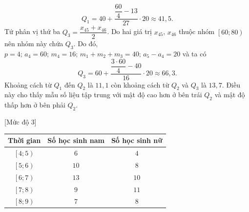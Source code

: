 \begin{bt}
{\begin{enumerate}
			$$Q_1=40+\dfrac{\dfrac{60}{4}-13}{27}\cdot 20\approx 41{,}5.$$
			Tứ phân vị thứ ba $Q_3=\dfrac{x_{45}+x_{46}}{2}$. Do hai giá trị $x_{45}$, $x_{46}$ thuộc nhóm $\left[60;80\right)$ nên nhóm này chứa $Q_3$. Do đó, $p=4;\,a_4=60;\,m_4=16;\,m_1+m_2+m_3=40;\,a_5-a_4=20$ và ta có
			$$Q_3=60+\dfrac{\dfrac{3\cdot 60}{4}-40}{16}\cdot 20\approx 66{,}3.$$
			Khoảng cách từ $Q_1$ đến $Q_2$ là $11{,}1$ còn khoảng cách từ $Q_2$ và $Q_3$ là $13{,}7$. Điều này cho thấy mẫu số liệu tập trung với mật độ cao hơn ở bên trái $Q_2$ và mật độ thấp hơn ở bên phải $Q_2$.
		\end{enumerate}	
	}
\end{bt}

\begin{bt}%
[Mức độ 3]%
	{
		\begin{tabular}{|c|c|c|}
			\hline
			Thời gian	& Số học sinh nam & Số học sinh nữ\\
			\hline
			$\left[4;5\right)$	& $6$ & $4$\\
			\hline
			$\left[5;6\right)$	& $10$ & $8$\\
			\hline
			$\left[6;7\right)$	& $13$ & $10$\\
			\hline
			$\left[7;8\right)$	& $9$ & $11$\\
			\hline
			$\left[8;9\right)$	& $7$ & $8$\\
			\hline
		\end{tabular}
	}
\end{bt}
